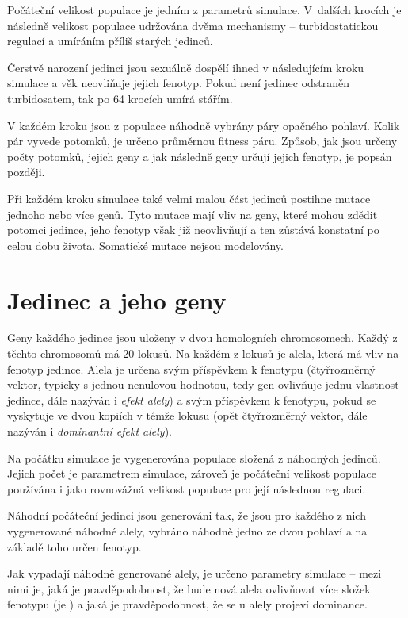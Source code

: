 Počáteční velikost populace je jedním z parametrů simulace.  V~dalších krocích je následně velikost populace
udržována dvěma mechanismy -- turbidostatickou regulací a umíráním příliš starých jedinců.

Čerstvě narození jedinci jsou sexuálně dospělí ihned v následujícím kroku simulace a věk neovliňuje jejich fenotyp.
Pokud není jedinec odstraněn turbidosatem, tak po 64 krocích umírá stářím.

V každém kroku jsou z populace náhodně vybrány páry opačného pohlaví.
Kolik pár vyvede potomků, je určeno průměrnou fitness páru. Způsob, jak jsou určeny počty potomků, jejich geny a
jak následně geny určují jejich fenotyp, je popsán později.

Při každém kroku simulace také velmi malou část jedinců postihne mutace jednoho nebo více genů. Tyto mutace mají
vliv na geny, které mohou zdědit potomci jedince, jeho fenotyp však již neovlivňují a ten zůstává konstatní po celou
dobu života. Somatické mutace nejsou modelovány.

\section{Jedinec a jeho geny}
\label{sec:individual_genes}

Geny každého jedince jsou uloženy v dvou homologních chromosomech. Každý z těchto chromosomů má 20 lokusů.
Na každém z lokusů je alela, která má vliv na fenotyp jedince. Alela je určena svým příspěvkem k fenotypu (čtyřrozměrný
vektor, typicky s jednou nenulovou hodnotou, tedy gen ovlivňuje jednu vlastnost jedince, dále nazýván i
\textit{efekt alely}) a svým příspěvkem k fenotypu, pokud se vyskytuje ve dvou kopiích v témže lokusu
(opět čtyřrozměrný vektor, dále nazýván i \textit{dominantní efekt alely}).

Na počátku simulace je vygenerována populace složená z náhodných jedinců.
Jejich počet je parametrem simulace, zároveň je počáteční velikost populace používána i jako rovnovážná velikost
populace pro její následnou regulaci.

Náhodní počáteční jedinci jsou generováni tak, že jsou pro každého z nich vygenerované náhodné alely, vybráno náhodně
jedno ze dvou pohlaví a na základě toho určen fenotyp.

Jak vypadají náhodně generované alely, je určeno parametry simulace -- mezi nimi je, jaká je pravděpodobnost, že bude
nová alela ovlivňovat více složek fenotypu (je ) a jaká je pravděpodobnost, že se u alely projeví
dominance.

